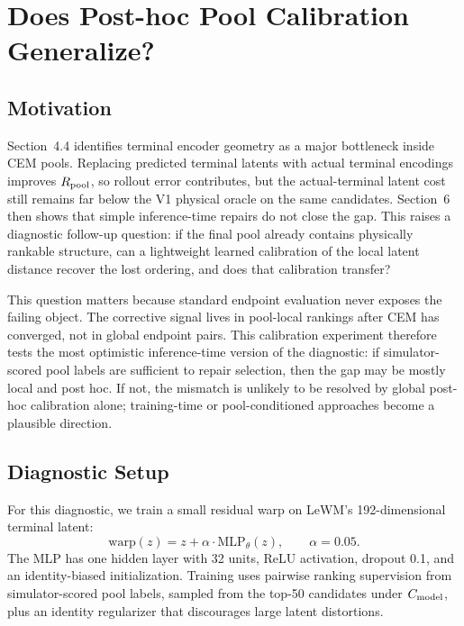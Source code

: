\section{Does Post-hoc Pool Calibration Generalize?}
\label{sec:warp_ensemble}

\subsection{Motivation}

Section~4.4 identifies terminal encoder geometry as a major bottleneck inside CEM pools. Replacing predicted terminal latents with actual terminal encodings improves $R_\text{pool}$, so rollout error contributes, but the actual-terminal latent cost still remains far below the V1 physical oracle on the same candidates. Section~6 then shows that simple inference-time repairs do not close the gap. This raises a diagnostic follow-up question: if the final pool already contains physically rankable structure, can a lightweight learned calibration of the local latent distance recover the lost ordering, and does that calibration transfer?

This question matters because standard endpoint evaluation never exposes the failing object. The corrective signal lives in pool-local rankings after CEM has converged, not in global endpoint pairs. This calibration experiment therefore tests the most optimistic inference-time version of the diagnostic: if simulator-scored pool labels are sufficient to repair selection, then the gap may be mostly local and post hoc. If not, the mismatch is unlikely to be resolved by global post-hoc calibration alone; training-time or pool-conditioned approaches become a plausible direction.

\subsection{Diagnostic Setup}

For this diagnostic, we train a small residual warp on LeWM's 192-dimensional terminal latent:
\begin{equation}
\mathrm{warp}(z)=z+\alpha\cdot \mathrm{MLP}_{\theta}(z), \qquad \alpha=0.05.
\label{eq:warp}
\end{equation}
The MLP has one hidden layer with 32 units, ReLU activation, dropout 0.1, and an identity-biased initialization. Training uses pairwise ranking supervision from simulator-scored pool labels, sampled from the top-50 candidates under $C_\text{model}$, plus an identity regularizer that discourages large latent distortions.

